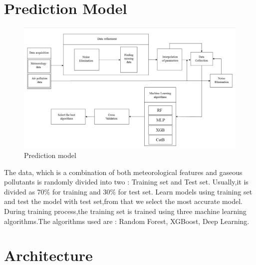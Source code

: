 \section {Prediction Model}

\begin{figure}[h!]
\label{bb}
\centering
\includegraphics[width= 14 cm]{prearch.jpg}
\caption{Prediction model }
\end{figure}

The data, which is a combination of both meteorological features and gaseous pollutants is randomly divided into two : Training set and Test set. Usually,it is divided as 70\% for training and 30\% for  test set. Learn models using training set and test the model with test set,from that we select the most accurate model. During training process,the training set is trained using three machine learning algorithms.The algorithms used are : Random Forest, XGBoost, Deep Learning.

\pagebreak

\section {Architecture}


